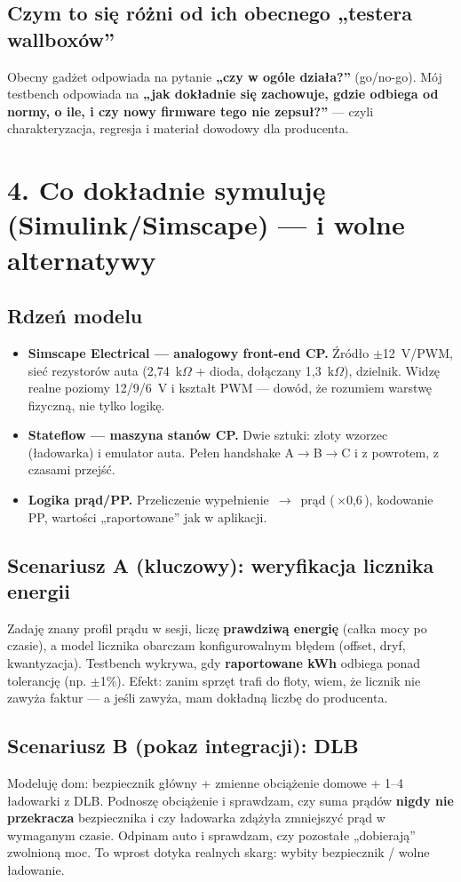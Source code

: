 \documentclass[11pt]{article}
\newcommand{\ra}{$\rightarrow$}
\newcommand{\key}[1]{\textbf{\color{navy}#1}}
\begin{document}
\subsection{Czym to się różni od ich obecnego „testera wallboxów''}

Obecny gadżet odpowiada na pytanie \key{„czy w ogóle działa?''} (go/no-go). Mój testbench odpowiada na \key{„jak dokładnie się zachowuje, gdzie odbiega od normy, o ile, i czy nowy firmware tego nie zepsuł?''} --- czyli charakteryzacja, regresja i materiał dowodowy dla producenta.

\section{4. Co dokładnie symuluję (Simulink/Simscape) --- i wolne alternatywy}

\subsection{Rdzeń modelu}
\begin{itemize}
  \item \key{Simscape Electrical --- analogowy front-end CP.} Źródło $\pm$12~V/PWM, sieć rezystorów auta (2,74~k$\Omega$ + dioda, dołączany 1,3~k$\Omega$), dzielnik. Widzę realne poziomy 12/9/6~V i kształt PWM --- dowód, że rozumiem warstwę fizyczną, nie tylko logikę.
  \item \key{Stateflow --- maszyna stanów CP.} Dwie sztuki: złoty wzorzec (ładowarka) i emulator auta. Pełen handshake A\ra{}B\ra{}C i z powrotem, z czasami przejść.
  \item \key{Logika prąd/PP.} Przeliczenie wypełnienie~\ra{}~prąd (\,$\times$0,6\,), kodowanie PP, wartości „raportowane'' jak w aplikacji.
\end{itemize}

\subsection{Scenariusz A (kluczowy): weryfikacja licznika energii}
Zadaję znany profil prądu w sesji, liczę \key{prawdziwą energię} (całka mocy po czasie), a model licznika obarczam konfigurowalnym błędem (offset, dryf, kwantyzacja). Testbench wykrywa, gdy \key{raportowane kWh} odbiega ponad tolerancję (np. $\pm$1\%). Efekt: zanim sprzęt trafi do floty, wiem, że licznik nie zawyża faktur --- a jeśli zawyża, mam dokładną liczbę do producenta.

\subsection{Scenariusz B (pokaz integracji): DLB}
Modeluję dom: bezpiecznik główny + zmienne obciążenie domowe + 1--4 ładowarki z DLB. Podnoszę obciążenie i sprawdzam, czy suma prądów \key{nigdy nie przekracza} bezpiecznika i czy ładowarka zdążyła zmniejszyć prąd w wymaganym czasie. Odpinam auto i sprawdzam, czy pozostałe „dobierają'' zwolnioną moc. To wprost dotyka realnych skarg: wybity bezpiecznik / wolne ładowanie.
\end{document}
